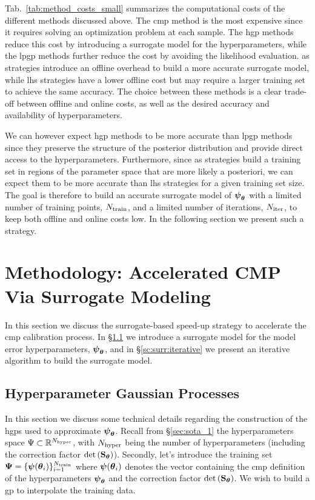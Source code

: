 Tab.~\ref{tab:method_costs_small} summarizes the computational costs of the different methods discussed above. The \gls{cmp} method is the most expensive since it requires solving an optimization problem at each sample. The \gls{hgp} methods reduce this cost by introducing a surrogate model for the hyperparameters, while the \gls{lpgp} methods further reduce the cost by avoiding the likelihood evaluation. \gls{as} strategies introduce an offline overhead to build a more accurate surrogate model, while \gls{lhs} strategies have a lower offline cost but may require a larger training set to achieve the same accuracy. The choice between these methods is a clear trade-off between offline and online costs, as well as the desired accuracy and availability of hyperparameters.

\smallskip
We can however expect \gls{hgp} methods to be more accurate than \gls{lpgp} methods since they preserve the structure of the posterior distribution and provide direct access to the hyperparameters. Furthermore, since \gls{as} strategies build a training set in regions of the parameter space that are more likely a posteriori, we can expect them to be more accurate than \gls{lhs} strategies for a given training set size. The goal is therefore to build an accurate surrogate model of $\boldsymbol{\psi}_{\boldsymbol{\theta}}$ with a limited number of training points, $N_{\mathrm{train}}$, and a limited number of iterations, ${N_{\mathrm{iter}}}$, to keep both offline and online costs low. In the following section we present such a strategy.

\section{Methodology: Accelerated CMP Via Surrogate Modeling}
\label{sc:surr:accel-calibr}

In this section we discuss the surrogate-based speed-up strategy to accelerate the \gls{cmp} calibration process. In \S\ref{sc:surr:surrogate} we introduce a surrogate model for the model error hyperparameters, $\boldsymbol{\psi}_{\boldsymbol{\theta}}$, and in \S\ref{sc:surr:iterative} we present an iterative algorithm to build the surrogate model.

\subsection{Hyperparameter Gaussian Processes}
\label{sc:surr:surrogate}

In this section we discuss some technical details regarding the construction of the \glspl{hgp} used to approximate $\boldsymbol{\psi}_{\boldsymbol{\theta}}$. Recall from \S\ref{sec:sota_1} the hyperparameters space $\Psi \subset \mathbb{R}^{N_{\mathrm{hyper}}}$, with $N_{\mathrm{hyper}}$ being the number of hyperparameters (including the correction factor $\mathrm{det}\left(\mathbf{S}_{\boldsymbol{\theta}}\right)$). Secondly, let's introduce the training set $\boldsymbol{\Psi} = \{\boldsymbol{\psi}(\boldsymbol{\theta}_i)\}_{i=1}^{N_{\mathrm{train}}}$ where $\boldsymbol{\psi}(\boldsymbol{\theta}_i)$ denotes the vector containing the \gls{cmp} definition of the hyperparameters $\boldsymbol{\psi}_{\boldsymbol{\theta}}$ and the correction factor $\mathrm{det}\left(\mathbf{S}_{\boldsymbol{\theta}}\right)$. We wish to build a \gls{gp} to interpolate the training data.

